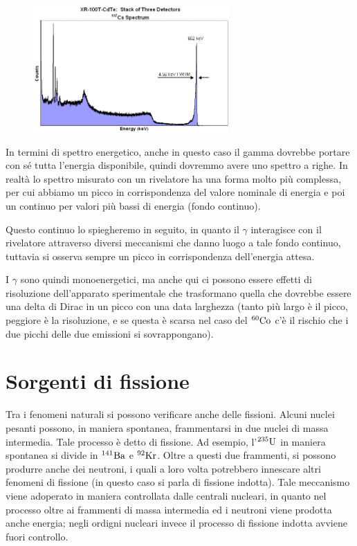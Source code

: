 \begin{minipage}{0.495\textwidth}
    \begin{figure}[H]
        \includegraphics[width=7.5cm]{immagini/spettro_gamma.png}
    \end{figure}
\end{minipage}
\begin{minipage}{0.5\textwidth}
    \vspace{0.8cm}In termini di spettro energetico, anche in questo caso il gamma dovrebbe portare con sé tutta l'energia disponibile, quindi dovremmo avere uno spettro a righe. In realtà lo spettro misurato con un rivelatore ha una forma molto più complessa, per cui abbiamo un picco in corrispondenza del valore nominale di energia e poi un continuo per valori più bassi di energia (fondo continuo).
\end{minipage}

\vspace{0.2cm}Questo continuo lo spiegheremo in seguito, in quanto il $\gamma$ interagisce con il rivelatore attraverso diversi meccanismi che danno luogo a tale fondo continuo, tuttavia si osserva sempre un picco in corrispondenza dell'energia attesa.

I $\gamma$ sono quindi monoenergetici, ma anche qui ci possono essere effetti di risoluzione dell'apparato sperimentale che trasformano quella che dovrebbe essere una delta di Dirac in un picco con una data larghezza (tanto più largo è il picco, peggiore è la risoluzione, e se questa è scarsa nel caso del $\rm ^{60} Co$ c'è il rischio che i due picchi delle due emissioni si sovrappongano).

\section{Sorgenti di fissione}

Tra i fenomeni naturali si possono verificare anche delle fissioni. Alcuni nuclei pesanti possono, in maniera spontanea, frammentarsi in due nuclei di massa intermedia. Tale processo è detto di fissione. Ad esempio, l'$\rm ^{235}U$ in maniera spontanea si divide in $\rm ^{141}Ba$ e $\rm ^{92}Kr$. Oltre a questi due frammenti, si possono produrre anche dei neutroni, i quali a loro volta potrebbero innescare altri fenomeni di fissione (in questo caso si parla di fissione indotta). Tale meccanismo viene adoperato in maniera controllata dalle centrali nucleari, in quanto nel processo oltre ai frammenti di massa intermedia ed i neutroni viene prodotta anche energia; negli ordigni nucleari invece il processo di fissione indotta avviene fuori controllo.

